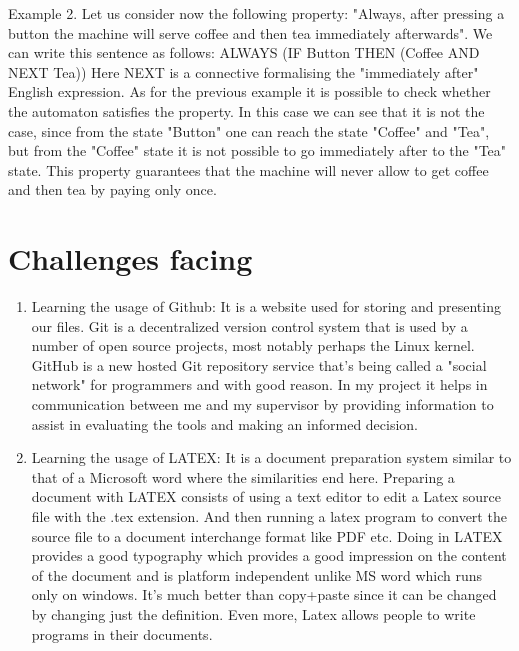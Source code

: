 \documentclass{article}
\begin{document}
Example 2.
Let us consider now the following property: "Always, after pressing a button the machine will serve coffee and then tea immediately afterwards". We can write this sentence as follows:
ALWAYS (IF Button THEN (Coffee AND NEXT Tea))
Here NEXT is a connective formalising the "immediately after" English expression. As for the previous example it is possible to check whether the automaton satisfies the property. In this case we can see that it is not the case, since from the state "Button" one can reach the state "Coffee" and "Tea", but from the "Coffee" state it is not possible to go immediately after to the "Tea" state. This property guarantees that the machine will never allow to get coffee and then tea by paying only once.



\section{Challenges facing}
\label{sec:challenges}

\begin{enumerate}

\item Learning the usage of Github: It is a website used for storing and presenting our files. Git is a decentralized version control system that is used by a number of open source projects, most notably perhaps the Linux kernel. GitHub is a new hosted Git repository service that's being called a "social network" for programmers and with good reason. In my project it helps in communication between me and my supervisor by providing information to assist in evaluating the tools and making an informed decision.

\item Learning the usage of LATEX: It is a document preparation system similar to that of a Microsoft word where the similarities end here. Preparing a document with LATEX consists of using a text editor to edit a Latex source file with the .tex extension. And then running a latex program to convert the source file to a document interchange format like PDF etc. Doing in LATEX provides a good typography which provides a good impression on the content of the document and is platform independent unlike MS word which runs only on windows. It's much better than copy+paste since it can be changed by changing just the definition. Even more, Latex allows people to write programs in their documents.

\end{enumerate}
\end{document}
